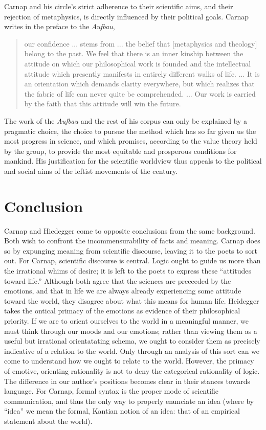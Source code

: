 \documentclass[leqno, 12pt]{turabian-researchpaper}
\begin{document}
	Carnap and his circle's strict adherence to their scientific aims, and their
	rejection of metaphysics, is directly influenced by their political goals.
	Carnap writes in the preface to the \textit{Aufbau}, \blockquote[{\cite[xvii-xviii]{carnap2003}}]{our confidence ... stems from ... the belief that [metaphysics and theology] belong to the past. We feel that there is an inner kinship between the attitude on which our philosophical work is founded and the intellectual attitude which presently manifests in entirely different walks of life. ... It is an orientation which demands clarity everywhere, but which realizes that the fabric of life can never quite be comprehended. ... Our work is carried by the faith that this attitude will win the future.}
	The work of the \textit{Aufbau} and the rest of his corpus can only be explained
	by a pragmatic choice, the choice to pursue the method which has so far given
	us the most progress in science, and which promises, according to the value
	theory held by the group, to provide the most equitable and prosperous conditions
	for mankind. His justification for the scientific worldview thus appeals to
	the political and social aims of the leftist movements of the  century.

	\section{Conclusion}

	Carnap and Hiedegger come to opposite conclusions from the same background. Both
	wish to confront the incommensurability of facts and meaning. Carnap does so
	by expunging meaning from scientific discourse, leaving it to the poets to sort
	out. For Carnap, scientific discourse is central. Logic ought to guide us more
	than the irrational whims of desire; it is left to the poets to express these \enquote{attitudes toward life.}
	Although both agree that the sciences are preceeded by the emotions, and that in
	life we are always already experiencing some attitude toward the world, they
	disagree about what this means for human life. Heidegger takes the ontical primacy
	of the emotions as evidence of their philosophical priority. If we are to
	orient ourselves to the world in a meaningful manner, we must think through our
	moods and our emotions; rather than viewing them as a useful but irrational
	orientatating schema, we ought to consider them as precisely indicative of a relation
	to the world. Only through an analysis of this sort can we come to understand
	how we ought to relate to the world. However, the primacy of emotive, orienting
	rationality is not to deny the categorical rationality of logic. The
	difference in our author's positions becomes clear in their stances towards
	language. For Carnap, formal syntax is the proper mode of scientific
	communication, and thus the only way to properly enunciate an idea (where by
	\enquote{idea} we mean the formal, Kantian notion of an idea: that of an empirical
	statement about the world). %
\end{document}
